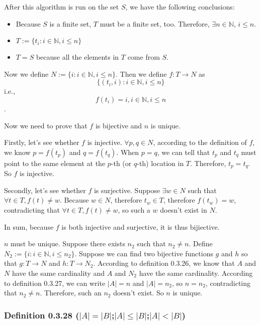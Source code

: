 \documentclass[12pt, letterpaper, oneside]{book}
\begin{document}
After this algorithm is run on the set $S$, we have the following conclusions:
\begin{itemize}
  \item Because $S$ is a finite set, $T$ must be a finite set, too. Therefore,
    $\exists n \in \mathbb{N}$, $i \leq n$.
  \item $T:= \{t_i: i \in \mathbb{N}, i \leq n \}$
  \item $T = S$ because all the elements in $T$ come from $S$.
\end{itemize}

Now we define $N := \{i: i \in \mathbb{N}, i \leq n\}$. Then we define
$f: T \rightarrow N$ as \[\{(t_i, i): i \in \mathbb{N}, i \leq n\}\] i.e., \[
f(t_i) = i, i \in \mathbb{N}, i \leq n\].

Now we need to prove that $f$ is bijective and $n$ is unique.

Firstly, let's see whether $f$ is injective. $\forall p, q \in N$, according to
the definition of $f$, we know $p = f(t_p)$ and $q = f(t_q)$. When $p = q$, we
can tell that $t_p$ and $t_q$ must point to the same element at the $p$-th (or
$q$-th) location in $T$. Therefore, $t_p = t_q$. So $f$ is injective.

Secondly, let's see whether $f$ is surjective. Suppose $\exists w \in N$ such
that $\forall t \in T, f(t) \neq w$. Because $w \in N$, therefore $t_w \in T$,
therefore $f(t_w) = w$, contradicting that $\forall t \in T, f(t) \neq w$, so
such a $w$ doesn't exist in $N$.

In sum, because $f$ is both injective and surjective, it is thus bijiective.

$n$ must be unique. Suppose there exists $n_2$ such that $n_2 \neq n$.
Define $N_2:= \{i: i \in \mathbb{N}, i \leq n_2\}$. Suppose we can find two
bijective functions $g$ and $h$ so that $g: T \rightarrow N$ and $h: T
\rightarrow N_2$. According to definition 0.3.26, we know that $A$ and $N$ have
the same cardinality and $A$ and $N_2$ have the same cardinality. According to
definition 0.3.27, we can write $|A| = n$ and $|A| = n_2$, so $n = n_2$,
contradicting that $n_2 \neq n$. Therefore, such an $n_2$ doesn't exist. So $n$
is unique.

\subsubsection*{Definition 0.3.28 ($|A|=|B|$;$|A| \leq |B|$;$|A|<|B|$)}
\end{document}
